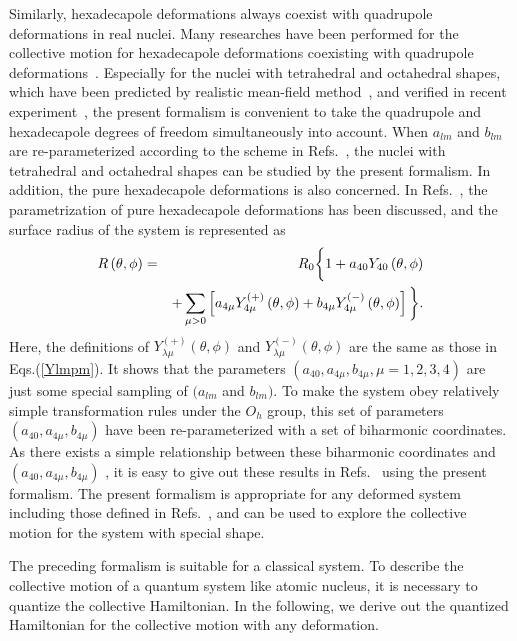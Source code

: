 \documentclass[twocolumn,prc,showpacs,preprintnumbers,superscriptaddress,floatfix]{revtex4}
\begin{document}
Similarly, hexadecapole deformations always coexist with quadrupole
deformations in real nuclei. Many researches have been performed for the
collective motion for hexadecapole deformations coexisting with quadrupole
deformations~\cite{VanIsacker15}. Especially for the nuclei with tetrahedral
and octahedral shapes, which have been predicted by realistic mean-field
method~\cite{Dudek02,Dudek06}, and verified in recent experiment~\cite%
{Bijker14}, the present formalism is convenient to take the quadrupole and
hexadecapole degrees of freedom simultaneously into account. When $a_{lm}$
and $b_{lm}$ are re-parameterized according to the scheme in Refs.~\cite%
{Dudek02,Dudek06}, the nuclei with tetrahedral and octahedral shapes can be
studied by the present formalism. In addition, the pure hexadecapole
deformations is also concerned. In Refs.~\cite{Nazarewicz81,Sobiczewski81,Rohozinski97}, the parametrization of pure hexadecapole deformations has been discussed, and the surface
radius of the system is represented as
\begin{eqnarray}
R\left( \theta ,\phi \right)  &=&R_{0}\bigg\{1+a_{40}Y_{40}\left( \theta
,\phi \right)   \notag \\
&&+\sum_{\mu >0}\left[ a_{4\mu }Y_{4\mu }^{\left( +\right) }\left( \theta
,\phi \right) +b_{4\mu }Y_{4\mu }^{\left( -\right) }\left( \theta ,\phi
\right) \right] \bigg\}.  \label{Rhex}
\end{eqnarray}%
Here, the definitions of $Y_{\lambda \mu }^{\left( +\right)
}\left( \theta ,\phi \right) $ and $Y_{\lambda \mu }^{\left( -\right)
}\left( \theta ,\phi \right) $ are the same as those in Eqs.(\ref{Ylmpm}). It shows that the parameters $\left( a_{40},a_{4\mu },b_{4\mu },\mu =1,2,3,4\right) $ are just some special sampling of $(a_{lm}$ and $b_{lm})$. To make the system obey
relatively simple transformation rules under the $O_{h}$ group, this set of parameters $%
\left( a_{40},a_{4\mu },b_{4\mu }\right) $ have been re-parameterized with a
set of biharmonic coordinates. As there exists a simple relationship between
these biharmonic coordinates and $\left( a_{40},a_{4\mu },b_{4\mu }\right) $%
, it is easy to give out these results in Refs.~\cite%
{Nazarewicz81,Sobiczewski81,Rohozinski97} using the present formalism. The
present formalism is appropriate for any deformed system including those
defined in Refs.~\cite%
{Nazarewicz81,Sobiczewski81,Rohozinski97,Dudek02,Dudek06}, and can be used
to explore the collective motion for the system with special shape.

The preceding formalism is suitable for a classical system. To describe the
collective motion of a quantum system like atomic nucleus, it is necessary
to quantize the collective Hamiltonian. In the following, we derive out the
quantized Hamiltonian for the collective motion with any deformation.
\end{document}
